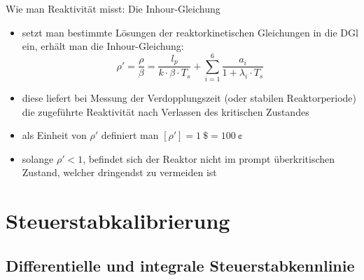 \documentclass[10pt]{beamer}
\begin{document}
		\begin{frame}{Wie man Reaktivität misst: Die Inhour-Gleichung}
					\begin{itemize}
						\item setzt man bestimmte Lösungen der reaktorkinetischen Gleichungen in die DGl ein, erhält man die Inhour-Gleichung:
							\begin{equation*}
								\rho\prime = \frac{\rho}{\beta} = \frac{l_p}{k\cdot\beta \cdot T_s}+ \sum_{i=1}^{6} \frac{a_i}{1 + \lambda_i\cdot T_s}
							\end{equation*}
						\item diese liefert bei Messung der Verdopplungszeit (oder stabilen Reaktorperiode) die zugeführte Reaktivität nach Verlassen des kritischen Zustandes
						\item als Einheit von $\rho\prime$ definiert man $[\rho\prime] = 1\ \unit{\$} = 100\ \unit{\cent}$
						\item solange $\rho\prime < 1$, befindet sich der Reaktor nicht im prompt überkritischen Zustand, welcher dringendst zu vermeiden ist 
					\end{itemize}	
		\end{frame}

\section{Steuerstabkalibrierung}
	\subsection{Differentielle und integrale Steuerstabkennlinie}
	
\end{document}
